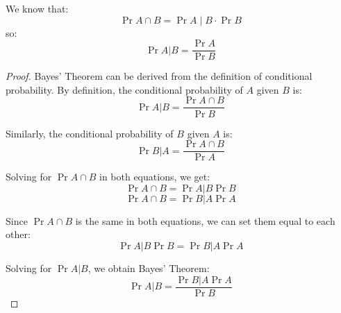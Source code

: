\begin{tcolorbox}[colframe=black, colback=white, sharp corners]
We know that:
	\begin{equation*}
		\Pr {A \cap B} = \Pr {A \mid B} \cdot \Pr {B}
	\end{equation*}
so:
	\begin{equation*}
			\Pr{A|B} = \frac{\Pr{A}}{\Pr{B}}
	\end{equation*}
	
\begin{proof}
	
	Bayes' Theorem can be derived from the definition of conditional probability. By definition, the conditional probability of \(A\) given \(B\) is:
	\begin{equation*}
		\Pr{A|B} = \frac {\Pr{A \cap B}}{\Pr{B}}
	\end{equation*}
	
	Similarly, the conditional probability of \(B\) given \(A\) is:
	\begin{equation*}
		\Pr{B|A} = \frac{\Pr{A \cap B}}{\Pr{A}}
	\end{equation*}
	
	Solving for \(\Pr{A \cap B}\) in both equations, we get:
	\begin{equation*}
		\Pr{A \cap B} = \Pr{A|B} \Pr{B}
	\end{equation*}
	\begin{equation*}
		\Pr{A \cap B} = \Pr{B|A} \Pr{A}
	\end{equation*}
	
	Since \(\Pr{A \cap B}\) is the same in both equations, we can set them equal to each other:
	\begin{equation*}
		\Pr{A|B} \Pr{B} = \Pr{B|A} \Pr{A}
	\end{equation*}
	
	Solving for \(\Pr{A|B}\), we obtain Bayes' Theorem:
	\begin{equation*}
		\Pr{A|B} = \frac{\Pr{B|A} \Pr{A}}{\Pr{B}}
	\end{equation*}
\end{proof}
\end{tcolorbox}


